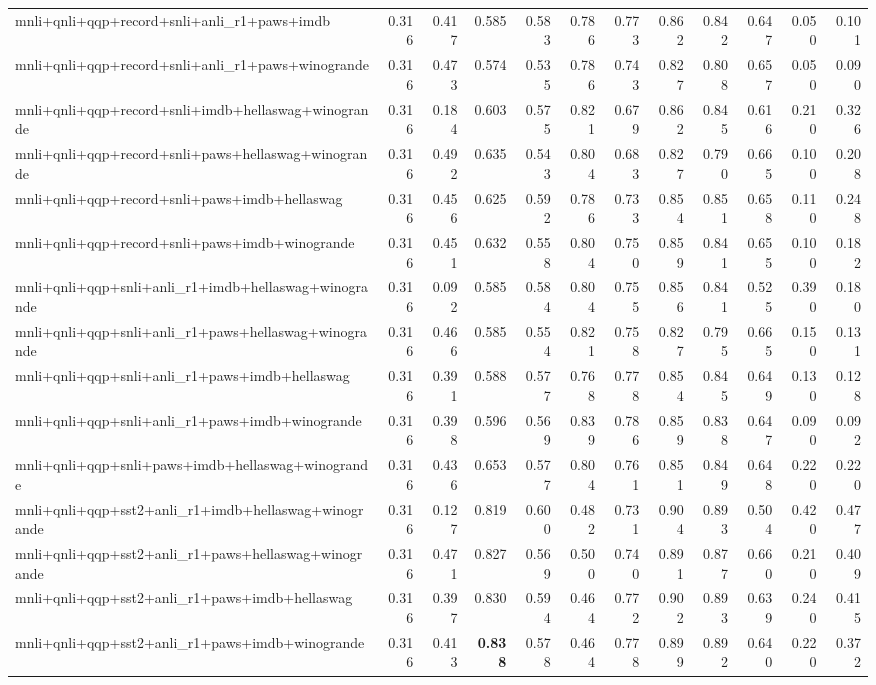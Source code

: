 \begin{table}[t]
\begin{tabular}{lrrrrrrrrrrr}
    mnli+qnli+qqp+record+snli+anli\_r1+paws+imdb & 0.316 & 0.417 & 0.585 & 0.583 & 0.786 & 0.773 & 0.862 & 0.842 & 0.647 & 0.050 & 0.101 \\
    mnli+qnli+qqp+record+snli+anli\_r1+paws+winogrande & 0.316 & 0.473 & 0.574 & 0.535 & 0.786 & 0.743 & 0.827 & 0.808 & 0.657 & 0.050 & 0.090 \\
    mnli+qnli+qqp+record+snli+imdb+hellaswag+winogrande & 0.316 & 0.184 & 0.603 & 0.575 & 0.821 & 0.679 & 0.862 & 0.845 & 0.616 & 0.210 & 0.326 \\
    mnli+qnli+qqp+record+snli+paws+hellaswag+winogrande & 0.316 & 0.492 & 0.635 & 0.543 & 0.804 & 0.683 & 0.827 & 0.790 & 0.665 & 0.100 & 0.208 \\
    mnli+qnli+qqp+record+snli+paws+imdb+hellaswag & 0.316 & 0.456 & 0.625 & 0.592 & 0.786 & 0.733 & 0.854 & 0.851 & 0.658 & 0.110 & 0.248 \\
    mnli+qnli+qqp+record+snli+paws+imdb+winogrande & 0.316 & 0.451 & 0.632 & 0.558 & 0.804 & 0.750 & 0.859 & 0.841 & 0.655 & 0.100 & 0.182 \\
    mnli+qnli+qqp+snli+anli\_r1+imdb+hellaswag+winogrande & 0.316 & 0.092 & 0.585 & 0.584 & 0.804 & 0.755 & 0.856 & 0.841 & 0.525 & 0.390 & 0.180 \\
    mnli+qnli+qqp+snli+anli\_r1+paws+hellaswag+winogrande & 0.316 & 0.466 & 0.585 & 0.554 & 0.821 & 0.758 & 0.827 & 0.795 & 0.665 & 0.150 & 0.131 \\
    mnli+qnli+qqp+snli+anli\_r1+paws+imdb+hellaswag & 0.316 & 0.391 & 0.588 & 0.577 & 0.768 & 0.778 & 0.854 & 0.845 & 0.649 & 0.130 & 0.128 \\
    mnli+qnli+qqp+snli+anli\_r1+paws+imdb+winogrande & 0.316 & 0.398 & 0.596 & 0.569 & 0.839 & 0.786 & 0.859 & 0.838 & 0.647 & 0.090 & 0.092 \\
    mnli+qnli+qqp+snli+paws+imdb+hellaswag+winogrande & 0.316 & 0.436 & 0.653 & 0.577 & 0.804 & 0.761 & 0.851 & 0.849 & 0.648 & 0.220 & 0.220 \\
    mnli+qnli+qqp+sst2+anli\_r1+imdb+hellaswag+winogrande & 0.316 & 0.127 & 0.819 & 0.600 & 0.482 & 0.731 & 0.904 & 0.893 & 0.504 & 0.420 & 0.477 \\
    mnli+qnli+qqp+sst2+anli\_r1+paws+hellaswag+winogrande & 0.316 & 0.471 & 0.827 & 0.569 & 0.500 & 0.740 & 0.891 & 0.877 & 0.660 & 0.210 & 0.409 \\
    mnli+qnli+qqp+sst2+anli\_r1+paws+imdb+hellaswag & 0.316 & 0.397 & 0.830 & 0.594 & 0.464 & 0.772 & 0.902 & 0.893 & 0.639 & 0.240 & 0.415 \\
    mnli+qnli+qqp+sst2+anli\_r1+paws+imdb+winogrande & 0.316 & 0.413 & \textbf{0.838} & 0.578 & 0.464 & 0.778 & 0.899 & 0.892 & 0.640 & 0.220 & 0.372 \\

\end{tabular}
\end{table}
